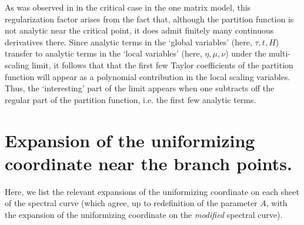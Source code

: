 \documentclass[usenames,dvipsnames]{article}
\theoremstyle{definition}
\numberwithin{equation}{section}
\numberwithin{figure}{section}
\begin{document}
As was observed in \cite{BleherDeano} in the critical case in the one matrix model, this regularization factor arises from the fact that, although the partition function is not analytic near the critical point, it does admit finitely many continuous derivatives there. Since analytic terms in the `global variables' (here, $\tau,t,H$) transfer to analytic terms in the `local variables' (here, $\eta,\mu,\nu$) under the multi-scaling limit, it follows that that the first few Taylor coefficients of the partition function will appear as a polynomial contribution in the local scaling variables. Thus, the `interesting' part of the limit appears when one subtracts off the regular part of the partition function, i.e. the first few analytic terms. 

\section{Expansion of the uniformizing coordinate near the branch points.} \label{Appendix-A}
Here, we list the relevant expansions of the uniformizing coordinate on each sheet of the spectral curve (which agree, up to redefinition of the parameter $A$, with the expansion of the uniformizing coordinate on the \textit{modified} spectral curve). 
\end{document}
